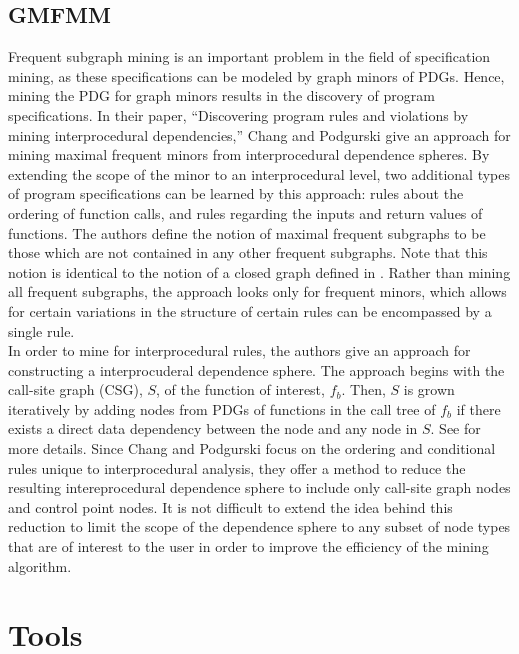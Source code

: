 \documentclass[12pt]{article}
\begin{document}
\subsection{GMFMM}
\noindent Frequent subgraph mining is an important problem in the field of
specification mining, as these specifications can be modeled by graph minors
of PDGs. Hence, mining the PDG for graph minors results in the discovery of
program specifications. In their paper, ``Discovering program rules and
violations by mining interprocedural dependencies,''
\cite{DBLP:journals/smr/ChangP12} Chang and Podgurski give an approach for
mining maximal frequent minors from interprocedural dependence spheres. By
extending the scope of the minor to an interprocedural level, two additional
types of program specifications can be learned by this approach: rules about
the ordering of function calls, and rules regarding the inputs and return
values of functions. The authors define the notion of maximal frequent
subgraphs to be those which are not contained in any other frequent subgraphs.
Note that this notion is identical to the notion of a closed graph defined in
\cite{Yan:2003:CMC:956750.956784}. Rather than mining all frequent subgraphs,
the approach looks only for frequent minors, which allows for certain
variations in the structure of certain rules can be encompassed by a single
rule.
\\

In order to mine for interprocedural rules, the authors give an approach for constructing a interprocuderal dependence sphere. The approach begins with the call-site graph (CSG), $S$, of the function of interest, $f_b$. Then, $S$ is grown iteratively by adding nodes from PDGs of functions in the call tree of $f_b$ if there exists a direct data dependency between the node and any node in $S$. See \cite{DBLP:journals/smr/ChangP12} for more details. Since Chang and Podgurski focus on the ordering and conditional rules unique to interprocedural analysis, they offer a method to reduce the resulting intereprocedural dependence sphere to include only call-site graph nodes and control point nodes. It is not difficult to extend the idea behind this reduction to limit the scope of the dependence sphere to any subset of node types that are of interest to the user in order to improve the efficiency of the mining algorithm.

\section{Tools}
\label{section:Tools and Data Sources}
\end{document}
